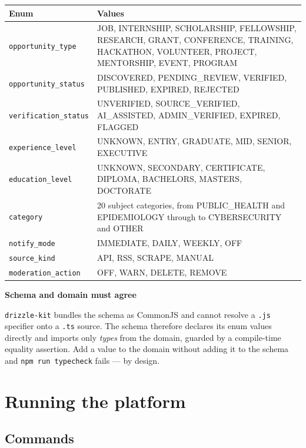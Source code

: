 \documentclass[11pt,a4paper]{report}
\newenvironment{callout}[1]
  {\begin{framed}\noindent\textbf{\textcolor{phcWarnInk}{#1}}\par\vspace{3pt}\small}
  {\end{framed}}
\newcommand{\dash}{---}
\begin{document}
\begin{center}
\begin{tabularx}{\textwidth}{@{}lX@{}}
\toprule
\textbf{Enum} & \textbf{Values} \\
\midrule
\texttt{opportunity\_type} & JOB, INTERNSHIP, SCHOLARSHIP, FELLOWSHIP,
RESEARCH, GRANT, CONFERENCE, TRAINING, HACKATHON, VOLUNTEER, PROJECT,
MENTORSHIP, EVENT, PROGRAM \\
\texttt{opportunity\_status} & DISCOVERED, PENDING\_REVIEW, VERIFIED,
PUBLISHED, EXPIRED, REJECTED \\
\texttt{verification\_status} & UNVERIFIED, SOURCE\_VERIFIED, AI\_ASSISTED,
ADMIN\_VERIFIED, EXPIRED, FLAGGED \\
\texttt{experience\_level} & UNKNOWN, ENTRY, GRADUATE, MID, SENIOR, EXECUTIVE \\
\texttt{education\_level} & UNKNOWN, SECONDARY, CERTIFICATE, DIPLOMA,
BACHELORS, MASTERS, DOCTORATE \\
\texttt{category} & 20 subject categories, from PUBLIC\_HEALTH and
EPIDEMIOLOGY through to CYBERSECURITY and OTHER \\
\texttt{notify\_mode} & IMMEDIATE, DAILY, WEEKLY, OFF \\
\texttt{source\_kind} & API, RSS, SCRAPE, MANUAL \\
\texttt{moderation\_action} & OFF, WARN, DELETE, REMOVE \\
\bottomrule
\end{tabularx}
\end{center}

\begin{callout}{Schema and domain must agree}
\texttt{drizzle-kit} bundles the schema as CommonJS and cannot resolve a
\texttt{.js} specifier onto a \texttt{.ts} source. The schema therefore declares
its enum values directly and imports only \emph{types} from the domain, guarded
by a compile-time equality assertion. Add a value to the domain without adding
it to the schema and \texttt{npm run typecheck} fails \dash{} by design.
\end{callout}

\chapter{Running the platform}

\section{Commands}
\end{document}
